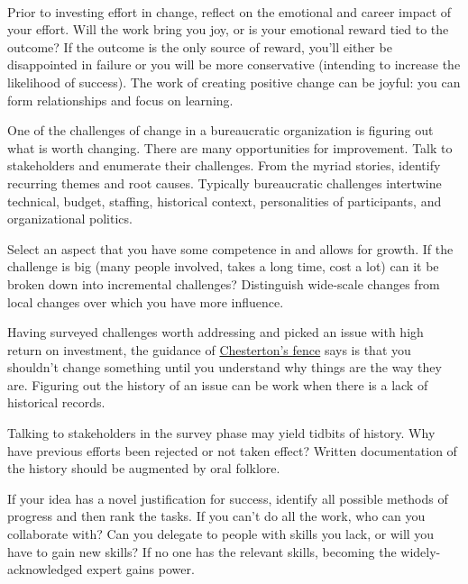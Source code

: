 \ \\

Prior to investing effort in change, reflect on the emotional and career impact of your effort. Will the work bring you joy, or is your emotional reward tied to the outcome? If the outcome is the only source of reward, you'll either be disappointed in failure or you will be more conservative (intending to increase the likelihood of success). The work of creating positive change can be joyful: you can form relationships and focus on learning. 

One of the challenges of change in a bureaucratic organization is figuring out what is worth changing. There are many opportunities for improvement. Talk to stakeholders and enumerate their challenges.
From the myriad stories, identify recurring themes and root causes. Typically bureaucratic challenges intertwine technical, budget, staffing, historical context, personalities of participants, and organizational politics. 

Select an aspect that you have some competence in and allows for growth. If the challenge is big (many people involved, takes a long time, cost a lot) can it be broken down into incremental challenges? Distinguish wide-scale changes from local changes over which you have more influence.

Having surveyed challenges worth addressing and picked an issue with high return on investment, the guidance of
\href{https://en.wikipedia.org/wiki/G._K._Chesterton\%23Chesterton\%27s_fence}{Chesterton's fence} 
says
is that you shouldn't change something until you understand why things are the way they are. Figuring out the history of an issue can be work when there is a lack of historical records.

Talking to stakeholders in the survey phase may yield tidbits of history. Why have previous efforts been rejected or not taken effect? Written documentation of the history should be augmented by oral folklore. 

If your idea has a novel justification for success, identify all possible methods of progress and then rank the tasks. If you can't do all the work, who can you collaborate with? Can you delegate to people with skills you lack, or will you have to gain new skills? 
If no one has the relevant skills, becoming the widely-acknowledged expert gains power. 



